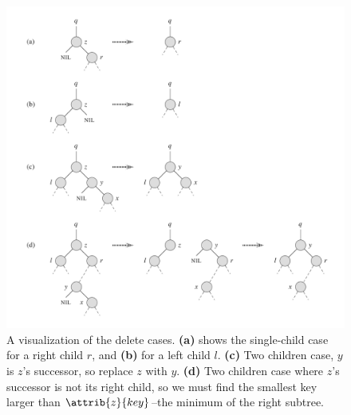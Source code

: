 \documentclass[12pt]{article}
\begin{document}
\begin{figure}[!ht]
\includegraphics[scale=0.5]{bst_delete_cases}
\caption{
    A visualization of the delete cases.
    \textbf{(a)} shows the single-child case for a right child $r$, and \textbf{(b)} for a left child $l$.
    \textbf{(c)} Two children case, $y$ is $z$'s successor, so replace $z$ with $y$.
    \textbf{(d)} Two children case where $z$'s successor is not its right child, so we must find the smallest key larger than $\attrib{z}{key}$--the minimum of the right subtree.
}
\label{fig:bst_delete}
\end{figure}
\end{document}
